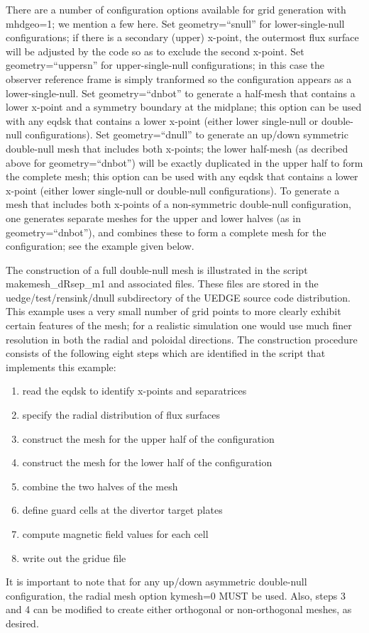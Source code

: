 \documentclass [12pt]{article}
\begin{document}
There are a number of configuration options available for grid
generation with {\sf mhdgeo}=1; we mention a few here.
Set {\sf geometry=``snull''} for lower-single-null configurations; if there
is a secondary (upper) x-point, the outermost flux surface will be
adjusted by the code so as to exclude the second x-point.
Set {\sf geometry=``uppersn''} for upper-single-null configurations; in this
case the observer reference frame is simply tranformed so the
configuration appears as a lower-single-null.
Set {\sf geometry=``dnbot''} to generate a half-mesh that contains a lower
x-point and a symmetry boundary at the midplane; this option can be
used with any eqdsk that contains a lower x-point (either lower
single-null or double-null configurations).
Set {\sf geometry=``dnull''} to generate an up/down symmetric double-null mesh
that includes both x-points; the lower half-mesh (as decribed above
for {\sf geometry=``dnbot''}) will be exactly duplicated in the upper half to
form the complete mesh; this option can be used with any eqdsk that
contains a lower x-point (either lower single-null or double-null
configurations).
To generate a mesh that includes both x-points of a non-symmetric
double-null configuration, one generates separate meshes for the upper
and lower halves (as in {\sf geometry=``dnbot''}), and combines these to form a
complete mesh for the configuration; see the example given below.

The construction of a full double-null mesh is illustrated in the script
 {\sf makemesh\_dRsep\_m1} and associated files.  These files
are stored in the {\sf uedge/test/rensink/dnull} subdirectory of the {\sf UEDGE}
source code distribution.  This example uses a very small number of
grid points to more clearly exhibit certain features of the mesh; for
a realistic simulation one would use much finer resolution in both the
radial and poloidal directions.  The construction procedure consists of the following eight steps which
are identified in the script that implements this example:
\begin{enumerate}
\item read the eqdsk to identify x-points and separatrices
\item specify the radial distribution of flux surfaces
\item construct the mesh for the upper half of the configuration
\item construct the mesh for the lower half of the configuration
\item combine the two halves of the mesh
\item define guard cells at the divertor target plates
\item compute magnetic field values for each cell
\item write out the {\sf gridue} file
\end{enumerate}
It is important to note that for any up/down asymmetric double-null
configuration, the radial mesh option {\sf kymesh}=0 MUST be used.  Also,
steps 3 and 4 can be modified to create either orthogonal or
non-orthogonal meshes, as desired.
\end{document}
